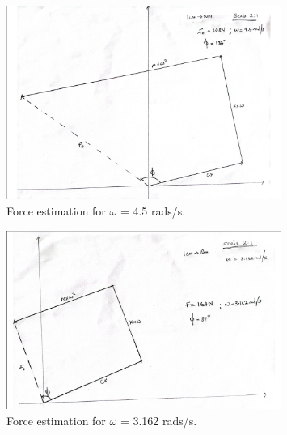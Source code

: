 \documentclass[12pt,a4paper]{article}
\begin{document}
\begin{figure}[H]
    \centering
    \includegraphics[width=0.8\textwidth]{4.5rads.png} 
    \caption{Force estimation for $\omega$ = 4.5 rads/s.}
    \label{fig:system}
\end{figure}

\begin{figure}[H]
    \centering
    \includegraphics[width=0.8\textwidth]{3.162rads.png} 
    \caption{Force estimation for $\omega$ = 3.162 rads/s.}
    \label{fig:system}
\end{figure}
\end{document}
